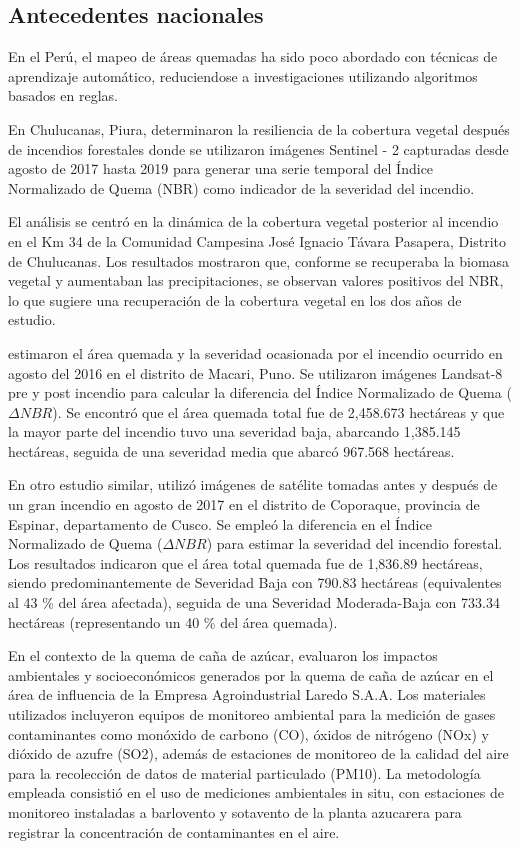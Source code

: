\subsection{Antecedentes nacionales}
En el Perú, el mapeo de áreas quemadas ha sido poco abordado con técnicas de aprendizaje automático, reduciendose a investigaciones utilizando algoritmos basados en reglas. 

En Chulucanas, Piura, \citet{jimenez_dios_resiliencia_2020} 
determinaron la resiliencia de la cobertura vegetal después de incendios forestales donde se utilizaron imágenes Sentinel - 2 capturadas desde agosto de 2017 hasta 2019 para generar una serie temporal del Índice Normalizado de Quema (NBR) como indicador
de la severidad del incendio. 

El análisis se centró en la dinámica de la cobertura vegetal posterior al incendio en el Km 34 de la Comunidad Campesina José Ignacio Távara Pasapera, Distrito de Chulucanas. Los resultados mostraron que, conforme se recuperaba
la biomasa vegetal y aumentaban las precipitaciones, se observan valores positivos del NBR, lo que sugiere una recuperación de la cobertura vegetal en los dos años de estudio.

\citet{anamuro-luque_alisis_2020} estimaron el área quemada y la severidad ocasionada por el incendio ocurrido en agosto del 2016 en el distrito de Macari, Puno. Se utilizaron imágenes Landsat-8 pre y post incendio para calcular la diferencia del Índice
Normalizado de Quema ($\Delta NBR$). Se encontró que el área quemada total fue de 2,458.673 hectáreas y que la mayor parte del incendio tuvo una severidad baja, abarcando 1,385.145 hectáreas, seguida de una severidad media que abarcó 
967.568 hectáreas.

En otro estudio similar, \citet{gonzales_vasquez_aplicacion_2022} utilizó imágenes de satélite tomadas antes y después de un gran incendio en agosto de 2017 en el distrito de Coporaque, provincia de Espinar, departamento de Cusco. Se empleó la diferencia en el Índice Normalizado de Quema ($\Delta NBR$) 
para estimar la severidad del incendio forestal. Los resultados indicaron que el área total quemada fue de 1,836.89 hectáreas, siendo predominantemente de Severidad Baja con 790.83 hectáreas (equivalentes al 43 \% del área afectada), seguida de una Severidad Moderada-Baja con 
733.34 hectáreas (representando un 40 \% del área quemada).

En el contexto de la quema de caña de azúcar, \citet{Carrera2010} evaluaron los impactos ambientales y socioeconómicos generados por la quema de caña de azúcar en el área de influencia de la Empresa Agroindustrial Laredo S.A.A. Los materiales utilizados incluyeron equipos de monitoreo ambiental para la 
medición de gases contaminantes como monóxido de carbono (CO), óxidos de nitrógeno (NOx) y dióxido de azufre (SO2), además de estaciones de monitoreo de la calidad del aire para la recolección de datos de material particulado (PM10)​. La metodología empleada consistió en el uso de mediciones ambientales in 
situ, con estaciones de monitoreo instaladas a barlovento y sotavento de la planta azucarera para registrar la concentración de contaminantes en el aire​. 

